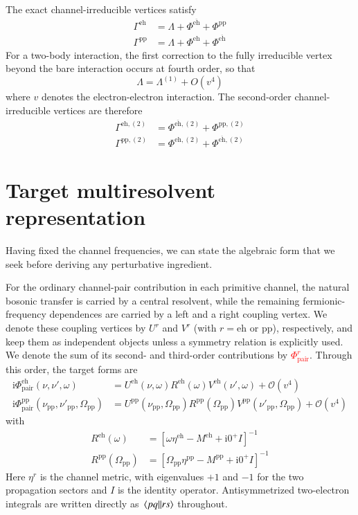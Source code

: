 \documentclass[aip,jcp,reprint,noshowkeys,superscriptaddress]{revtex4-1}
\newcommand{\titou}[1]{\textcolor{red}{#1}}
\newcommand{\ii}{\mathrm{i}}
\newcommand{\eh}{\text{eh}}
\newcommand{\teh}{\overline{\text{eh}}}
\newcommand{\pp}{\text{pp}}
\begin{document}
The exact channel-irreducible vertices satisfy
\begin{align}
	\Gamma^\eh
	&=
	\Lambda
	+
	\Phi^{\teh}
	+
	\Phi^\pp
	\label{eq:Gamma_eh}
	\\
	\Gamma^\pp
	&=
	\Lambda
	+
	\Phi^\eh
	+
	\Phi^{\teh}
	\label{eq:Gamma_pp}
\end{align}
For a two-body interaction, the first correction to the fully irreducible
vertex beyond the bare interaction occurs at fourth order, so that
\begin{equation}
	\Lambda
	=
	\Lambda^{(1)}
	+
	O(v^4)
	\label{eq:Lambda_order}
\end{equation}
where $v$ denotes the electron-electron interaction.
The second-order channel-irreducible vertices are therefore
\begin{align}
	\Gamma^{\eh,(2)}
	&=
	\Phi^{\teh,(2)}
	+
	\Phi^{\pp,(2)}
	\label{eq:Gamma_eh_second}
	\\
	\Gamma^{\pp,(2)}
	&=
	\Phi^{\eh,(2)}
	+
	\Phi^{\teh,(2)}
	\label{eq:Gamma_pp_second}
\end{align}

\section{Target multiresolvent representation}
\label{sec:target_representation}

Having fixed the channel frequencies, we can state the algebraic form that we
seek before deriving any perturbative ingredient.

For the ordinary channel-pair contribution in each primitive channel, the natural bosonic transfer is carried
by a central resolvent, while the remaining fermionic-frequency dependences
are carried by a left and a right coupling vertex.
We denote these coupling vertices by $U^r$ and $V^r$ (with $r = \eh$ or $\pp$), respectively, and keep
them as independent objects unless a symmetry relation is explicitly used.
We denote the sum of its second- and third-order contributions by
\titou{$\Phi^r_{\mathrm{pair}}$}. Through this order, the target forms are
\begin{align}
	\ii\Phi^\eh_{\mathrm{pair}}(\nu,\nu',\omega)
	&=
	U^\eh(\nu,\omega)
	R^\eh(\omega)
	V^\eh(\nu',\omega)
	+\mathcal O(v^4)
	\label{eq:target_eh}
	\\
	\ii\Phi^\pp_{\mathrm{pair}}(\nu_\pp,\nu'_\pp,\Omega_\pp)
	&=
	U^\pp(\nu_\pp,\Omega_\pp)
	R^\pp(\Omega_\pp)
	V^\pp(\nu'_\pp,\Omega_\pp)
	+\mathcal O(v^4)
	\label{eq:target_pp}
\end{align}
with
\begin{align}
	R^\eh(\omega)
	&=
	\left[
	\omega\eta^\eh-M^\eh + \ii 0^+ I
	\right]^{-1}
	\label{eq:target_R_eh}
	\\
	R^\pp(\Omega_\pp)
	&=
	\left[
	\Omega_\pp\eta^\pp-M^\pp + \ii 0^+ I
	\right]^{-1}
	\label{eq:target_R_pp}
\end{align}
Here $\eta^r$ is the channel metric, with eigenvalues $+1$ and $-1$ for
the two propagation sectors and $I$ is the identity operator.
Antisymmetrized two-electron integrals are written directly as
$\mel{pq}{}{rs}$ throughout.
\end{document}
